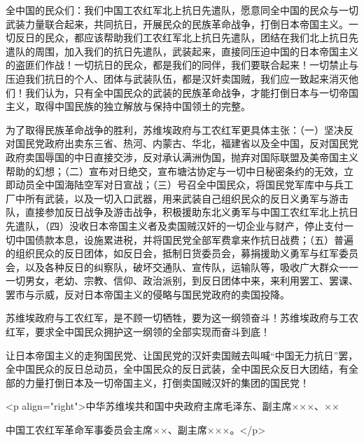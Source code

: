 全中国的民众们：我们中国工农红军北上抗日先遣队，愿意同全中国的民众与一切武装力量联合起来，共同抗日，开展民众的民族革命战争，打倒日本帝国主义。一切反日的民众，都应该帮助我们工农红军北上抗日先遣队，团结在我们北上抗日先遣队的周围，加入我们的抗日先遣队，武装起来，直接同压迫中国的日本帝国主义的盗匪们作战！一切抗日的民众，都是我们的同伴，我们要联合起来！一切禁止与压迫我们抗日的个人、团体与武装队伍，都是汉奸卖国贼，我们应一致起来消灭他们！我们认为，只有全中国民众的武装的民族革命战争，才能打倒日本与一切帝国主义，取得中国民族的独立解放与保持中国领土的完整。

为了取得民族革命战争的胜利，苏维埃政府与工农红军更具体主张：（一）坚决反对国民党政府出卖东三省、热河、内蒙古、华北，福建省以及全中国，反对国民党政府卖国辱国的中日直接交涉，反对承认满洲伪国，抛弃对国际联盟及美帝国主义帮助的幻想；（二）宣布对日绝交，宣布塘沽协定与一切中日秘密条约的无效，立即动员全中国海陆空军对日宣战；（三）号召全中国民众，将国民党军库中与兵工厂中所有武装，以及一切入口武器，用来武装自己组织民众的反日义勇军与游击队，直接参加反日战争及游击战争，积极援助东北义勇军与中国工农红军北上抗日先遣队，（四）没收日本帝国主义者及卖国贼汉奸的一切企业与财产，停止支付一切中国债款本息，设施累进税，并将国民党全部军费拿来作抗日战费；（五）普遍的组织民众的反日团体，如反日会，抵制日货委员会，募捐援助义勇军与红军委员会，以及各种反日的纠察队，破坏交通队、宣传队，运输队等，吸收广大群众一一一切男女，老幼、宗教、信仰、政治派别，到反日团体中来，来利用罢工、罢课、罢市与示威，反对日本帝国主义的侵略与国民党政府的卖国投降。

苏维埃政府与工农红军，是不顾一切牺牲，要为这一纲领奋斗！苏维埃政府与工农红军，要求全中国民众拥护这一纲领的全部实现而奋斗到底！

让日本帝国主义的走狗国民党、让国民党的汉奸卖国贼去叫喊“中国无力抗日”罢，全中国民众的反日总动员，全中国民众的反日武装，全中国民众反日大团结，有全部的力量打倒日本及一切帝国主义，打倒卖国贼汉奸的集团的国民党！

<p align="right">中华苏维埃共和国中央政府主席毛泽东、副主席×××、××

中国工农红军革命军事委员会主席××、副主席×××。</p>


